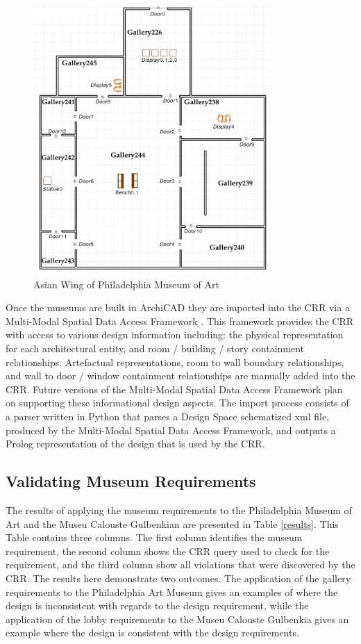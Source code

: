 \documentclass[12pt]{ucthesis}
\begin{document}
\begin{figure}[H]
\centering
\includegraphics[width=90mm]{museum-floor-plan-reqs-p}
\caption{Asian Wing of Philadelphia Museum of Art}
\label{philadelphia-museum-floorplan}
\end{figure}

Once the museums are built in ArchiCAD they are imported into the CRR via a Multi-Modal Spatial Data Access Framework \cite{carl}. This framework provides the CRR with access to various design information including: the physical representation for each architectural entity, and room / building / story containment relationships. Artefactual representations, room to wall boundary relationships, and wall to door / window containment relationships are manually added into the CRR. Future versions of the Multi-Modal Spatial Data Access Framework plan on supporting these informational design aspects. The import process consists of a parser written in Python that parses a Design Space schematized xml file, produced by the Multi-Modal Spatial Data Access Framework, and outputs a Prolog representation of the design that is used by the CRR.


\subsection{Validating Museum Requirements}
The results of applying the museum requirements to the Philadelphia Museum of Art and the Museu Calouste Gulbenkian are presented in Table \ref{results}. This Table contains three columns. The first column identifies the museum requirement, the second column shows the CRR query used to check for the requirement, and the third column show all violations that were discovered by the CRR. The results here demonstrate two outcomes. The application of the gallery requirements to the Philadelphia Art Museum gives an examples of where the design is inconsistent with regards to the design requirement, while the application of the lobby requirements to the Museu Calouste Gulbenkia gives an example where the design is consistent with the design requirements. 
\end{document}
